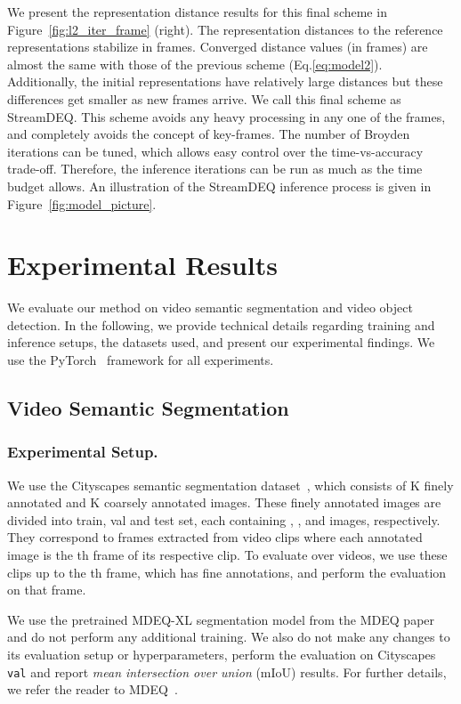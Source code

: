 \documentclass[runningheads]{llncs}
\begin{document}
We present the representation distance results for this final scheme in Figure~\ref{fig:l2_iter_frame} (right). The representation distances to the reference representations stabilize in  frames. Converged distance values (in  frames) are almost the same with those of the previous scheme (Eq.\ref{eq:model2}). Additionally, the initial representations have relatively large distances but these differences get smaller as new frames arrive. We call this final scheme as StreamDEQ. This scheme avoids any heavy processing in any one of the frames, and completely avoids the concept of key-frames. The number of Broyden iterations can be tuned, which allows easy control over the time-vs-accuracy trade-off.  Therefore, the inference iterations can be run as much as the time budget allows. An illustration of the StreamDEQ inference process is given in Figure~\ref{fig:model_picture}.


\section{Experimental Results} \label{sec:experiments}


We evaluate our method on video semantic segmentation and video object detection. In the following, we provide technical details regarding training and inference setups, the datasets used, and present our experimental findings. We use the PyTorch~\cite{pytorch} framework for all experiments. 


\subsection{Video Semantic Segmentation}


\subsubsection{Experimental Setup.}


We use the Cityscapes semantic segmentation dataset~\cite{cityscapesdataset}, which consists of K finely annotated and K coarsely annotated images. These finely annotated images are divided into train, val and test set, each containing , , and  images, respectively. They correspond to frames extracted from video clips where each annotated image is the th frame of its respective clip. To evaluate over videos, we use these clips up to the th frame, which has fine annotations, and perform the evaluation on that frame.


We use the pretrained MDEQ-XL segmentation model from the MDEQ paper~\cite{bai2020mdeq} and do not perform any additional training. We also do not make any changes to its evaluation setup or hyperparameters, perform the evaluation on Cityscapes \texttt{val} and report {\em mean intersection over union} (mIoU) results. For further details, we refer the reader to MDEQ~\cite{bai2020mdeq}.
\end{document}
